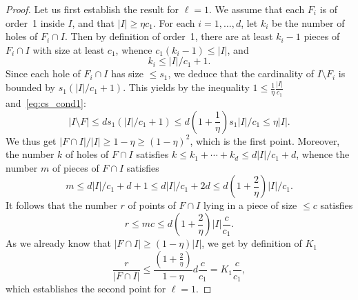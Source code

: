 \documentclass[AHL,Unicode,longabstracts]{cedram}
\begin{document}
\begin{proof}
Let us first establish the result for $\ell=1$. We assume that each $F_i$ is of order~1 inside $I$, and that $|I|\ge \eta c_1$. For each $i=1,\ldots,d$, let $k_i$ be the number of holes of $F_i\cap I$. Then by definition of order~1, there are at least $k_i-1$ pieces of $F_i\cap I$ with size at least $c_1$, whence $c_1(k_i-1)\le |I|$, and
\[
k_i\le |I|/c_1+1.
\]
Since each hole of $F_i\cap I$ has size $\le s_1$, we deduce that the cardinality of $I\setminus F_i$ is bounded by $s_1(|I|/c_1+1)$. This yields by the inequality $1\le \frac{1}{\eta}\frac{|I|}{c_1}$ and~\eqref{eq:cs_cond1}:
\[
|I\setminus F| \le ds_1(|I|/c_1+1) \le d\left(1+\frac{1}{\eta}\right)s_1|I|/c_1 \le \eta |I|.
\]
We thus get $|F\cap I|/|I| \ge 1-\eta\ge (1-\eta)^{2}$, which is the first point. Moreover, the number $k$ of holes of $F\cap I$ satisfies $k\le k_1+\cdots+k_d\le d|I|/c_1+d$, whence the number $m$ of pieces of $F\cap I$ satisfies
\[
m \le d|I|/c_1+d+1 \le d|I|/c_1+2d \le d\left(1+\frac{2}{\eta}\right)|I|/c_1.
\]
It follows that the number $r$ of points of $F\cap I$ lying in a piece of size $\le c$ satisfies
\[
r\le mc \le d\left(1+\frac{2}{\eta}\right)|I| \frac{c}{c_1}.
\]
As we already know that $|F\cap I|\ge (1-\eta)|I|$, we get by definition of $K_1$
\[
\frac{r}{|F\cap I|} \le \frac{\left(1+\frac{2}{\eta}\right)}{1-\eta} d \frac{c}{c_1} = K_1
\frac{c}{c_1},
\]
which establishes the second point for $\ell=1$.


\end{proof}
\end{document}
